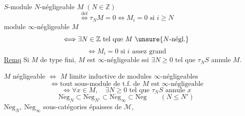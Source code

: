 \(S\)-module \(N\)-négligeable \(M\) \((N\in\mathbb Z)\)
\[
\overset{\mathrm{def}}\Longleftrightarrow\tau_NM=0
 \Longleftrightarrow M_i=0\text{ si }i\geq N
\]
module \(\infty\)-négligeable \(M\)
\[
\Longleftrightarrow\exists N\in\mathbb Z\text{ tel que }M\ \unsure{N\text{-négl.}}
\]
\[\Longleftrightarrow M_i=0\text{ si }i\text{ assez grand}\]
\uline{Remq} Si \(M\) de type fini, \(M\) est \(\infty\)-négligeable ssi
\(\exists N\geq0\) tel que \(\tau_NS\) annule \(M\).

\(M\) négligeable \(\Longleftrightarrow\) \(M\) limite inductive de modules
\(\infty\)-négligeables
\[
\Longleftrightarrow\text{tout sous-module de t.f. de }M\text{ est }\infty\text{-négligeable}
\]
\[
\Longleftrightarrow\forall x\in M,\quad\exists N\geq0\text{ tel que }\tau_NS\text{ annule }x
\]
\[
\mathrm{N\acute eg}_N\subset\mathrm{N\acute eg}_{N'}\subset
\mathrm{N\acute eg}_\infty\subset\mathrm{N\acute eg}
\qquad(N\leq N')
\]
\(\mathrm{N\acute eg}_N,\ \mathrm{N\acute eg}_\infty\) sous-catégories épaisses
de \(\mathcal M\),
